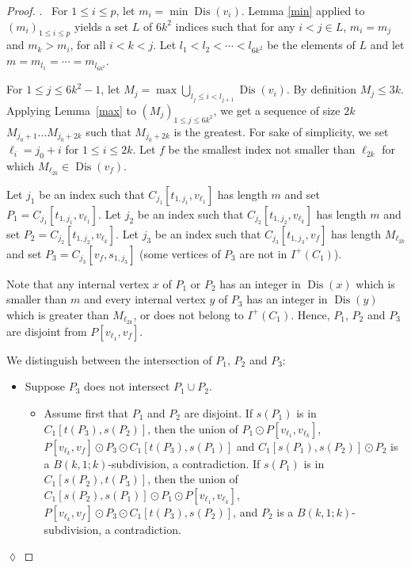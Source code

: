 \documentclass[utf8,10pt]{article}
\theoremstyle{plain}
\theoremstyle{definition}
\theoremstyle{remark}
\newenvironment{subproof}{\par\noindent {\it Subproof}.\ }{\hfill$\lozenge$\par\vspace{11pt}}
\DeclareMathOperator{\Dis}{Dis}
\begin{document}
\begin{proof}
\begin{subproof}
For $1\leq i\leq p$, let $m_i = \min \Dis(v_i)$. 
Lemma \ref{min} applied to $(m_i)_{1\leq i\leq p}$ yields a set $L$ of $6k^2$ indices such that 
for any $i< j \in L$,  $m_i=m_j$ and $m_k > m_i$, for all $i< k < j$.
Let $l_1 < l_2 < \cdots < l_{6k^2}$ be the elements of $L$ and let $m= m_{l_1} = \cdots = m_{l_{6k^2}}$.


For $1\leq j\leq 6k^2-1$, let $M_j = \max \bigcup_{l_j\leq i < l_{j+1}} \Dis(v_i)$.
By definition $M_j\leq 3k$.
Applying Lemma~\ref{max} to $(M_j)_{1\leq j\leq 6k^2}$,  we get a sequence of size $2k$ $M_{j_0+1} \dots M_{j_0+{2k}}$ such that $M_{j_0+{2k}}$ is the greatest. For sake of simplicity, we set $\ell_i =j_0+i$ for $1\leq i\leq 2k$.
Let $f$ be the smallest index not smaller than $\ell_{2k}$ for which $M_{\ell_{2k}} \in \Dis (v_f)$. 

Let $j_1$ be an index such that $C_{j_1}[t_{1,j_1},v_{\ell_1}]$ has length $m$ and set $P_1=C_{j_1}[t_{1,j_1},v_{\ell_1}]$.
Let $j_2$ be an index such that $C_{j_2}[t_{1,j_2},v_{\ell_k}]$ has length $m$ and set $P_2=C_{j_2}[t_{1,j_2},v_{\ell_k}]$.
Let $j_3$ be an index such that  $C_{j_3}[t_{1,j_3},v_{f}]$ has length $M_{\ell_{2k}}$ and set $P_3=C_{j_3}[v_f, s_{1,j_3}]$ (some vertices of $P_3$ are not in $I^+(C_1)$).

Note that any internal vertex $x$ of $P_1$ or $P_2$ has an integer in $\Dis(x)$
which is smaller than $m$ and every internal vertex $y$ of $P_3$ has an integer in $\Dis(y)$ which
is greater than $M_{\ell_{2k}}$, or does not belong to $I^+(C_1)$. Hence, 
$P_1$, $P_2$ and $P_3$ are disjoint from $P[v_{\ell_1},v_f]$. 


We distinguish between the intersection of $P_1$, $P_2$ and $P_3$:

\begin{itemize}
	\item Suppose $P_3$ does not intersect $P_1 \cup P_2$.
	\begin{itemize}
		\item Assume first that $P_1$ and $P_2$ are disjoint. If $s(P_1)$ is in $C_1[t(P_3), s(P_2)]$, then the union of  $P_1 \odot P[v_{\ell_1}, v_{\ell_k}]$, $P[v_{\ell_k}, v_f] \odot P_3\odot C_1[t(P_3), s(P_1)]$ and $C_1[s(P_1), s(P_2)]\odot P_2$ is a $B(k,1;k)$-subdivision, a contradiction.
		 If $s(P_1)$ is in $C_1[ s(P_2), t(P_3)]$, then the union of  $C_1[s(P_2), s(P_1)]\odot P_1\odot P[v_{\ell_1}, v_{\ell_k}]$, $P[v_{\ell_k}, v_f]\odot  P_3\odot C_1[t(P_3), s(P_2)]$, and  $P_2$ is a $B(k,1;k)$-subdivision, a contradiction.
	

\end{itemize}
\end{itemize}
\end{subproof}
\end{proof}
\end{document}

